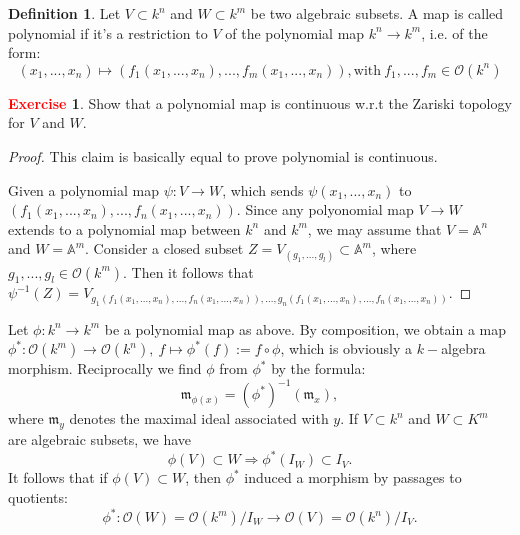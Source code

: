 \documentclass[12pt,a4paper,english]{article}
\theoremstyle{plain}
\theoremstyle{definition}
\newtheorem{defi}{Definition}
\newtheorem{exercise}{\textbf{\textcolor{red}{Exercise}}}
\theoremstyle{remark}
\begin{document}
\begin{defi}
Let $V\subset k^{n}$ and $W\subset k^{m}$ be two algebraic subsets. A map is called polynomial if it's a restriction to $V$ of the polynomial map $k^{n}\rightarrow k^{m}$,  i.e. of the form:
\begin{equation*}
    (x_{1},...,x_{n})\mapsto (f_{1}(x_{1},...,x_{n}),...,f_{m}(x_{1},...,x_{n})), \text{with}\ f_{1},...,f_{m}\in \mathcal{O}(k^{n})
\end{equation*}
\end{defi}
\begin{exercise}
Show that a polynomial map is continuous w.r.t the Zariski topology for $V$ and $W$.
\end{exercise}
\begin{tcolorbox}
\begin{proof}
This claim is basically equal to prove polynomial is continuous.


Given a polynomial map $\psi: V\rightarrow W$, which sends $\psi(x_{1},...,x_{n})$ to $(f_{1}(x_{1},...,x_{n}),...,f_{n}(x_{1},...,x_{n}))$.
Since any polyonomial map $V\rightarrow W$ extends to a polynomial map between $k^{n}$ and $k^{m}$, we may assume that  $V=\mathbb{A}^{n}$ and $W=\mathbb{A}^{m}$. Consider a closed subset $Z=V_{(g_{1},...,g_{l})}\subset \mathbb{A}^{m}$, where $g_{1},...,g_{l}\in\mathcal{O}(k^{m})$. Then it follows that $\psi^{-1}(Z)=V_{g_{1}(f_{1}(x_{1},...,x_{n}),...,f_{n}(x_{1},...,x_{n})),...,g_{n}(f_{1}(x_{1},...,x_{n}),...,f_{n}(x_{1},...,x_{n}))}$.
\end{proof}
\end{tcolorbox}
Let $\phi: k^{n}\rightarrow k^{m}$ be a polynomial map as above. By composition, we obtain a map $\phi^{*}:\mathcal{O}(k^{m})\rightarrow\mathcal{O}(k^{n}),\ f\mapsto \phi^{*}(f):=f\circ \phi$, which is obviously a $k-$algebra morphism. Reciprocally we find $\phi$ from $\phi^{*}$ by the formula:
\begin{equation*}
    \mathfrak{m}_{\phi(x)}=(\phi^{*})^{-1}(\mathfrak{m}_{x}),
\end{equation*}
where $\mathfrak{m}_{y}$ denotes the maximal ideal associated with $y$. If $V\subset k^{n}$ and $W\subset K^{m}$ are algebraic subsets, we have 
\begin{equation*}
    \phi(V)\subset W \Rightarrow \phi^{*}(I_{W})\subset I_{V}. 
\end{equation*}
It follows that if $\phi(V)\subset W$, then $\phi^{*}$ induced a morphism by passages to quotients:
\begin{equation*}
    \phi^{*}:\mathcal{O}(W)=\mathcal{O}(k^{m})/I_{W}\rightarrow \mathcal{O}(V)=\mathcal{O}(k^{n})/I_{V}.
\end{equation*}
\end{document}
